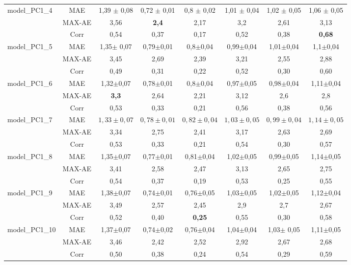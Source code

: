 \begin{table}[h!]
\begin{center}
\begin{tabular}{lc||c|c|c|c|c|c}
			\hline
			model\_PC1\_4&MAE & 1,39 $\pm$ 0,08 & 0,72 $\pm$ 0,01 & 0,8 $\pm$ 0,02 & 1,01 $\pm$ 0,04 & 1,02 $\pm$ 0,05 & 1,06 $\pm$ 0,05\\
			&MAX-AE &3,56&\textbf{2,4}&2,17&3,2&2,61&3,13\\
			&Corr &0,54&0,37&0,17&0,52&0,38&\textbf{0,68}\\
			
			\hline
			model\_PC1\_5&MAE & 1,35$\pm$ 0,07 & 0,79$\pm$0,01 &0,8$\pm$0,04 &0,99$\pm$0,04 &1,01$\pm$0,04 &1,1$\pm$0,04\\
			&MAX-AE &3,45&2,69&2,39&3,21&2,55&2,88\\
			&Corr &0,49&0,31&0,22&0,52&0,30&0,60\\
			
			\hline
			model\_PC1\_6&MAE & 1,32$\pm$0,07 & 0,78$\pm$0,01 &0,8$\pm$0,04& 0,97$\pm$0,05 & 0,98$\pm$0,04 &1,11$\pm$0,04\\
			&MAX-AE &\textbf{3,3}&2,64&2,21&3,12&2,6&2,8\\
			&Corr &0,53&0,33&0,21&0,56&0,38&0,56\\
			
			\hline
			model\_PC1\_7&MAE &$1,33\pm{0,07}$&$0,78\pm{0,01}$&$0,82\pm{0,04}$&$1,03\pm{0,05}$&$0,99\pm{0,04}$&$1,14\pm{0,05}$\\
			&MAX-AE &3,34&2,75&2,41&3,17&2,63&2,69\\
			&Corr &0,53&0,33&0,21&0,54&0,30&0,57\\
			
			\hline
			model\_PC1\_8&MAE & 1,35$\pm$0,07 & 0,77$\pm$0,01& 0,81$\pm$0,04&1,02$\pm$0,05& 0,99$\pm$0,05 & 1,14$\pm$0,05\\
			&MAX-AE &3,41&2,58&2,47&3,13&2,65&2,75\\
			&Corr &0,54&0,37&0,19&0,53&0,25&0,55\\
			
			\hline
			model\_PC1\_9&MAE & 1,38$\pm$0,07 & 0,74$\pm$0,01 & 0,76$\pm$0,05 & 1,03$\pm$0,05 & 1,02$\pm$0,05 & 1,12$\pm$0,04\\
			&MAX-AE &3,49&2,57&2,45&2,9&2,7&2,67\\
			&Corr &0,52&0,40&\textbf{0,25}&0,55&0,30&0,58\\
			
			\hline
			model\_PC1\_10&MAE & 1,37$\pm$0,07 & 0,74$\pm$0,02 & 0,76$\pm$0,04 & 1,04$\pm$0,04 & 1,03$\pm$ 0,05& 1,11$\pm$0,05\\
			&MAX-AE &3,46&2,42&2,52&2,92&2,67&2,68\\
			&Corr &0,50&0,38&0,24&0,54&0,29&0,59\\
			

\end{tabular}
\end{center}
\end{table}
